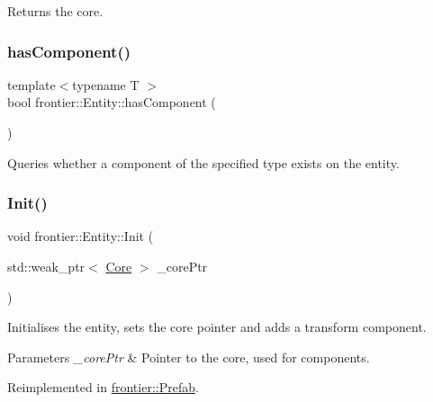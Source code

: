 Returns the core. 

\mbox{\label{classfrontier_1_1_entity_a52e5f9cb6d6f8fddef34f58b7cc5daa8}} 
\subsubsection{\texorpdfstring{has\+Component()}{hasComponent()}}
{\footnotesize\ttfamily template$<$typename T $>$ \\
bool frontier\+::\+Entity\+::has\+Component (\begin{DoxyParamCaption}{ }\end{DoxyParamCaption})\hspace{0.3cm}{\ttfamily [inline]}}



Queries whether a component of the specified type exists on the entity. 

\mbox{\label{classfrontier_1_1_entity_a94c998d26ccda48af3048eacd6d3c973}} 
\subsubsection{\texorpdfstring{Init()}{Init()}\hspace{0.1cm}{\footnotesize\ttfamily [1/3]}}
{\footnotesize\ttfamily void frontier\+::\+Entity\+::\+Init (\begin{DoxyParamCaption}\item[{std\+::weak\+\_\+ptr$<$ \hyperlink{classfrontier_1_1_core}{Core} $>$}]{\+\_\+core\+Ptr }\end{DoxyParamCaption})\hspace{0.3cm}{\ttfamily [virtual]}}



Initialises the entity, sets the core pointer and adds a transform component. 


\begin{DoxyParams}{Parameters}
{\em \+\_\+core\+Ptr} & Pointer to the core, used for components. \\
\hline
\end{DoxyParams}


Reimplemented in \hyperlink{classfrontier_1_1_prefab_a69924d353fb96975efbba17dc0ba3f3a}{frontier\+::\+Prefab}.

